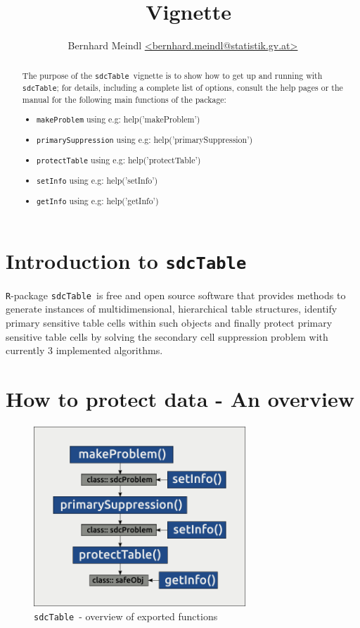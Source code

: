 \documentclass{article}
\author{Bernhard Meindl \url{<bernhard.meindl@statistik.gv.at>}}
\title{\sdcTable~Vignette}
\newcommand{\sdcTable}{{\tt sdcTable}}
\begin{document}
\maketitle
\begin{abstract}
  The purpose of the \sdcTable~vignette is to show how to get up and
  running with \sdcTable; for details, including a complete list of
  options, consult the help pages or the manual for the following 
  main functions of the package:
  \begin{itemize}
  \item {\tt makeProblem} using e.g: help('makeProblem')
  \item {\tt primarySuppression} using e.g: help('primarySuppression')
  \item {\tt protectTable} using e.g: help('protectTable')
  \item {\tt setInfo} using e.g: help('setInfo')
  \item {\tt getInfo} using e.g: help('getInfo')
  \end{itemize}
\end{abstract}
\tableofcontents

\newpage

\section{Introduction to \sdcTable}
{\tt R}-package \sdcTable~is free and open source software that provides 
methods to generate instances of multidimensional, hierarchical table structures,
identify primary sensitive table cells within such objects and finally protect
primary sensitive table cells by solving the secondary cell suppression problem
with currently 3 implemented algorithms. 

\section{How to protect data - An overview}

\begin{figure}[H]
 \centering
 \includegraphics[width=8cm]{overview}
 \caption{\sdcTable~- overview of exported functions}
 \label{fig:overview}
\end{figure}
\end{document}
